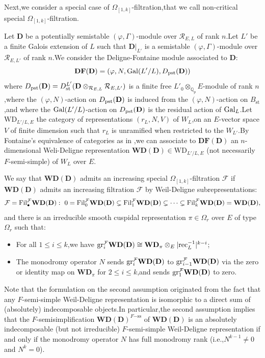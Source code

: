 \documentclass[SecEq,CM,GP]{degruyter-crelle} %
\theoremstyle{plain}
\newcommand{\df}{{\mathbf{DF}}}
\newcommand{\Dpik}{{\mathbf{D}}}
\newcommand{\fil}{{\rm Fil}}
\newcommand{\gal}{{\rm Gal}}
\newcommand{\gr}{{\rm gr}}
\newcommand{\omepik}{\Omega_{[1,k]}}
\newcommand{\pst}{{\rm pst}}
\newcommand{\rec}{{\rm rec}_L}
\newcommand{\wdre}{{\textbf{WD}}}
\newcommand{\BQ}{{\mathbb{Q}}}
\newcommand{\cR}{\mathcal R}
\newcommand{\cF}{\mathcal F}
\begin{document}
Next,\;we consider a special case of $\omepik$-filtration,\;that we call non-critical special $\omepik$-filtration.\;

Let $\Dpik$ be a potentially semistable $(\varphi,\Gamma)$-module over $\cR_{E,L}$ of rank $n$.\;Let $L'$ be a finite Galois extension of $L$ such that $\Dpik|_{L'}$ is a semistable $(\varphi,\Gamma)$-module over $\cR_{E,L'}$ of rank $n$.\;We consider the Deligne-Fontaine module associated to $\Dpik$:
$$\df(\Dpik)=(\varphi,N,\gal(L'/L),D_{\pst}(\Dpik))$$
where $D_{\pst}(\Dpik)=D_{\mathrm{st}}^{L'}(\Dpik\otimes_{\cR_{E,L}}\cR_{E,L'})$ is a finite free $L'_0\otimes_{\BQ_p}E$-module of rank $n$,\;where the $(\varphi,N)$-action on $D_{\pst}(\Dpik)$ is induced from the $(\varphi,N)$-action on $B_{\mathrm{st}}$,\;and where the 
$\gal(L'/L)$-action on  $D_{\pst}(\Dpik)$ is the residual action of $\gal_L$.\;Let  $\mathrm{WD}_{L'/L,E}$ the category of representations $(r_L,N,V)$ of $W_L$,\;on an $E$-vector space $V$ of finite dimension such that $r_L$ is unramified when restricted to the $W_{L'}$.\;By Fontaine's equivalence of categories as in \cite[Proposition 4.1]{breuil2007first},\;we can associate  to $\df(\Dpik)$ an $n$-dimensional Weli-Deligne representation $\wdre(\Dpik)\in \mathrm{WD}_{L'/L,E}$ (not necessarily $F$-semi-simple) of $W_L$ over $E$.\;

We say that $\wdre(\Dpik)$  admits an increasing special $\omepik$-filtration $\cF$ if $\wdre(\Dpik)$ admits an increasing filtration $\cF$ by Weil-Deligne subrepresentations:
\[\cF=\fil_{\bullet}^{\cF} \wdre(\Dpik): \ 0 =\fil_0^{\cF} \wdre(\Dpik) \subsetneq \fil_1^{\cF} \wdre(\Dpik) \subsetneq \cdots \subsetneq \fil_{k}^{\cF} \wdre(\Dpik)=\wdre(\Dpik),\]
and there is an irreducible smooth cuspidal representation $\pi\in \Omega_r$ over $E$ of type $ \Omega_r$ such that:
\begin{itemize}
\item For all $1\leqslant i\leqslant k$,\;we have $\gr^{\cF}_i\wdre(\Dpik)\cong \wdre_\pi\otimes_E|\rec^{-1}|^{k-i}$;
\item The monodromy operator $N$ sends $\gr^{\cF}_i\wdre(\Dpik)$ to
$\gr^{\cF}_{i-1}\wdre(\Dpik)$ via the zero or identity map on $\wdre_\pi$ for $2\leq i\leq k$,\;and sends $\gr^{\cF}_1\wdre(\Dpik)$ to zero.\;
\end{itemize}
Note that the formulation on the second assumption originated from the fact that any  $F$-semi-simple Weil-Deligne representation is isomorphic to a direct sum of (absolutely) indecomposable objects.\;In particular,\;the second  assumption implies that the $F$-semisimplification $\wdre(\Dpik)^{F\mathrm{-ss}}$ of $\wdre(\Dpik)$ is an absolutely indecomposable (but not irreducible) $F$-semi-simple Weil-Deligne representation if and only if the monodromy operator $N$ has full monodromy rank (i.e.,\;$N^{k-1}\neq 0$ and $N^k=0$).\;
\end{document}
